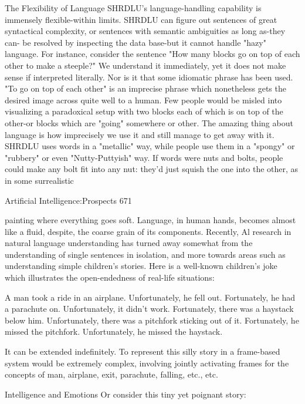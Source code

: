                             The Flexibility of Language
SHRDLU's language-handling capability is immensely flexible-within limits. SHRDLU
can figure out sentences of great syntactical complexity, or sentences with semantic
ambiguities as long as-they can- be resolved by inspecting the data base-but it cannot
handle "hazy" language. For instance, consider the sentence "How many blocks go on top
of each other to make a steeple?" We understand it immediately, yet it does not make
sense if interpreted literally. Nor is it that some idiomatic phrase has been used. "To go
on top of each other" is an imprecise phrase which nonetheless gets the desired image
across quite well to a human. Few people would be misled into visualizing a paradoxical
setup with two blocks each of which is on top of the other-or blocks which are "going"
somewhere or other.
        The amazing thing about language is how imprecisely we use it and still manage
to get away with it. SHRDLU uses words in a "metallic" way, while people use them in a
"spongy" or "rubbery" or even "Nutty-Puttyish" way. If words were nuts and bolts,
people could make any bolt fit into any nut: they'd just squish the one into the other, as in
some surrealistic




Artificial Intelligence:Prospects                                                        671

painting where everything goes soft. Language, in human hands, becomes almost like a
fluid, despite, the coarse grain of its components.
        Recently, Al research in natural language understanding has turned away
somewhat from the understanding of single sentences in isolation, and more towards
areas such as understanding simple children's stories. Here is a well-known children's
joke which illustrates the open-endedness of real-life situations:

    A man took a ride in an airplane.
       Unfortunately, he fell out.
    Fortunately, he had a parachute on.
       Unfortunately, it didn't work.
    Fortunately, there was a haystack below him.
       Unfortunately, there was a pitchfork sticking out of it.
    Fortunately, he missed the pitchfork.
       Unfortunately, he missed the haystack.

It can be extended indefinitely. To represent this silly story in a frame-based system
would be extremely complex, involving jointly activating frames for the concepts of man,
airplane, exit, parachute, falling, etc., etc.

                              Intelligence and Emotions
Or consider this tiny yet poignant story:

